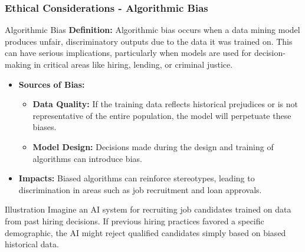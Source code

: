 \documentclass[aspectratio=169]{beamer}
\begin{document}
\begin{frame}[fragile]
    \frametitle{Ethical Considerations - Algorithmic Bias}
    \begin{block}{Algorithmic Bias}
        \textbf{Definition:} Algorithmic bias occurs when a data mining model produces unfair, discriminatory outputs due to the data it was trained on. This can have serious implications, particularly when models are used for decision-making in critical areas like hiring, lending, or criminal justice.
    \end{block}
    
    \begin{itemize}
        \item \textbf{Sources of Bias:}
        \begin{itemize}
            \item \textbf{Data Quality:} If the training data reflects historical prejudices or is not representative of the entire population, the model will perpetuate these biases.
            \item \textbf{Model Design:} Decisions made during the design and training of algorithms can introduce bias.
        \end{itemize}
        \item \textbf{Impacts:} Biased algorithms can reinforce stereotypes, leading to discrimination in areas such as job recruitment and loan approvals.
    \end{itemize}

    \begin{block}{Illustration}
        Imagine an AI system for recruiting job candidates trained on data from past hiring decisions. If previous hiring practices favored a specific demographic, the AI might reject qualified candidates simply based on biased historical data.
    \end{block}
\end{frame}
\end{document}
